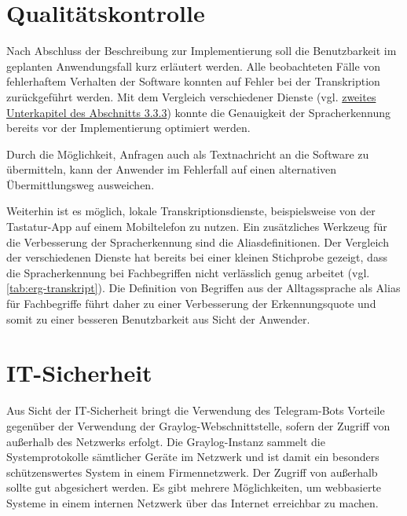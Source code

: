 \section{Qualitätskontrolle}

Nach Abschluss der Beschreibung zur Implementierung soll die Benutzbarkeit im geplanten Anwendungsfall kurz erläutert werden. Alle beobachteten Fälle von fehlerhaftem Verhalten der Software konnten auf Fehler bei der Transkription zurückgeführt werden. Mit dem Vergleich verschiedener Dienste (vgl. \hyperref[sec:vergleich-transkrip]{zweites Unterkapitel des Abschnitts 3.3.3}) konnte die Genauigkeit der Spracherkennung bereits vor der Implementierung optimiert werden. 

Durch die Möglichkeit, Anfragen auch als Textnachricht an die Software zu übermitteln, kann der Anwender im Fehlerfall auf einen alternativen Übermittlungsweg ausweichen. 

Weiterhin ist es möglich, lokale Transkriptionsdienste, beispielsweise von der Tastatur-App auf einem Mobiltelefon zu nutzen. Ein zusätzliches Werkzeug für die Verbesserung der Spracherkennung sind die Aliasdefinitionen. Der Vergleich der verschiedenen Dienste hat bereits bei einer kleinen Stichprobe gezeigt, dass die Spracherkennung bei Fachbegriffen nicht verlässlich genug arbeitet (vgl. \autoref{tab:erg-transkript}). Die Definition von Begriffen aus der Alltagssprache als Alias für Fachbegriffe führt daher zu einer Verbesserung der Erkennungsquote und somit zu einer besseren Benutzbarkeit aus Sicht der Anwender.

\section{IT-Sicherheit}

Aus Sicht der IT-Sicherheit bringt die Verwendung des Telegram-Bots Vorteile gegenüber der Verwendung der Graylog-Webschnittstelle, sofern der Zugriff von außerhalb des Netzwerks erfolgt. Die Graylog-Instanz sammelt die Systemprotokolle sämtlicher Geräte im Netzwerk und ist damit ein besonders schützenswertes System in einem Firmennetzwerk. Der Zugriff von außerhalb sollte gut abgesichert werden. Es gibt mehrere Möglichkeiten, um webbasierte Systeme in einem internen Netzwerk über das Internet erreichbar zu machen. 

